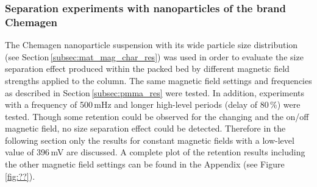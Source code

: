 \subsubsection{Separation experiments with nanoparticles of the brand Chemagen}
\label{subsubsec:chemagen_res}
The Chemagen nanoparticle suspension with its wide particle size distribution (see Section\,\ref{subsec:mat_mag_char_res}) was used in order to evaluate the size separation effect produced within the packed bed by different magnetic field strengths applied to the column. The same magnetic field settings and frequencies as described in Section\,\ref{subsec:pmma_res} were tested. In addition, experiments with a frequency of 500\,mHz and longer high-level periods (delay of 80\,\%) were tested. Though some retention could be observed for the changing and the on/off magnetic field, no size separation effect could be  detected. Therefore in the following section only the results for constant magnetic fields with a low-level value of 396\,mV are discussed. A complete plot of the retention results including the other magnetic field settings can be found in the Appendix (see Figure\,\ref{fig:??}).
   
